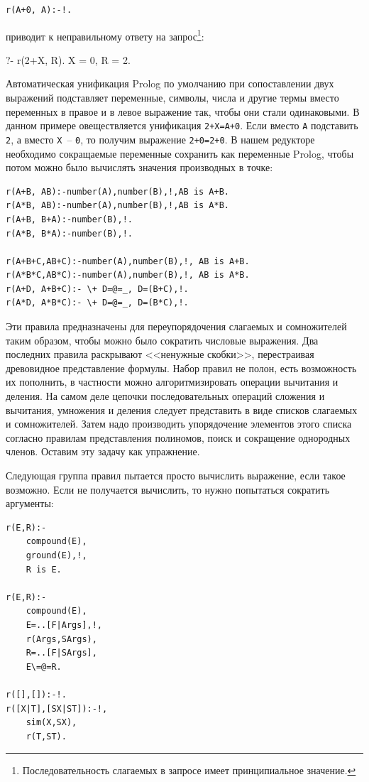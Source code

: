 \documentclass[a4paper,14pt, openany, twoside, draft]{extbook} %
\begin{document}
\begin{verbatim}
r(A+0, A):-!.
\end{verbatim}

\noindent{}приводит к неправильному ответу на запрос\footnote{Последовательность слагаемых в запросе имеет принципиальное значение.}:

\begin{proexp}
?- r(2+X, R).
X = 0,
R = 2.
\end{proexp}

Автоматическая унификация Prolog по умолчанию при сопоставлении двух выражений подставляет переменные, символы, числа и другие термы вместо переменных в правое и в левое выражение так, чтобы они стали одинаковыми.  В данном примере овеществляется унификация \texttt{2+X=A+0}.  Если вместо \texttt{A} подставить \texttt{2}, а вместо \texttt{X}~-- \texttt{0}, то получим выражение \texttt{2+0=2+0}.  В нашем редукторе необходимо сокращаемые переменные сохранить как переменные \foreignlanguage{english}{Prolog}, чтобы потом можно было вычислять значения производных в точке:

\begin{verbatim}
r(A+B, AB):-number(A),number(B),!,AB is A+B.
r(A*B, AB):-number(A),number(B),!,AB is A*B.
r(A+B, B+A):-number(B),!.
r(A*B, B*A):-number(B),!.

r(A+B+C,AB+C):-number(A),number(B),!, AB is A+B.
r(A*B*C,AB*C):-number(A),number(B),!, AB is A*B.
r(A+D, A+B+C):- \+ D=@=_, D=(B+C),!.
r(A*D, A*B*C):- \+ D=@=_, D=(B*C),!.
\end{verbatim}

Эти правила предназначены для переупорядочения слагаемых и сомножителей таким образом, чтобы можно было сократить числовые выражения.  Два последних правила раскрывают <<ненужные скобки>>, перестраивая древовидное представление формулы.  Набор правил не полон, есть возможность их пополнить, в частности можно алгоритмизировать операции вычитания и деления.  На самом деле цепочки последовательных операций сложения и вычитания, умножения и деления следует представить в виде списков слагаемых и сомножителей.  Затем надо производить упорядочение элементов этого списка согласно правилам представления полиномов, поиск и сокращение однородных членов.  Оставим эту задачу как упражнение.

Следующая группа правил пытается просто вычислить выражение, если такое возможно.  Если не получается вычислить, то нужно попытаться сократить аргументы:

\begin{verbatim}
r(E,R):-
    compound(E),
    ground(E),!,
    R is E.

r(E,R):-
    compound(E),
    E=..[F|Args],!,
    r(Args,SArgs),
    R=..[F|SArgs],
    E\=@=R.

r([],[]):-!.
r([X|T],[SX|ST]):-!,
    sim(X,SX),
    r(T,ST).
\end{verbatim}
\end{document}

